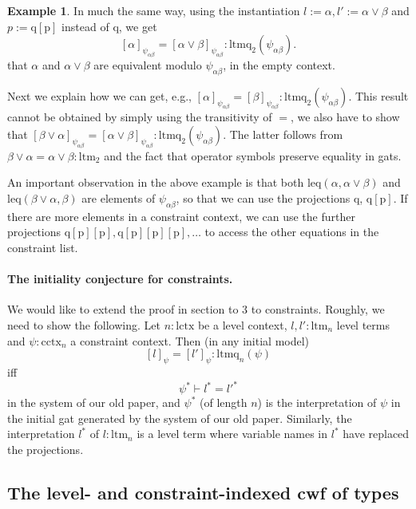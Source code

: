 \documentclass[11pt,a4paper]{article}
\theoremstyle{definition}
\newtheorem{example}{Example}
\newtheorem{conjecture}{Conjecture}
\def\psiab{\psi_{\alpha\beta}}
\def\lctx{\mathrm{lctx}}
\def\ltm{\mathrm{ltm}}
\def\ltmq{\mathrm{ltmq}}
\def\leq{\mathrm{leq}}
\def\cctx{\mathrm{cctx}}
\def\ctm{\mathrm{ctm}}
\def\p{\mathrm{p}}
\def\q{\mathrm{q}}
\begin{document}
\begin{example}
In much the same way, using the instantiation $l := \alpha,
l' := \alpha\vee\beta$ and $p := \q[\p]$ instead of $\q$, we get
\[
[\alpha]_{\psiab}=[\alpha\vee\beta]_{\psiab} : \ltmq_2(\psiab).
\]
that $\alpha$ and $\alpha\vee\beta$ are equivalent modulo $\psiab$, 
in the empty context.

Next we explain how we can get, e.g.,
$
[\alpha]_{\psiab} = [\beta]_{\psiab} : \ltmq_2(\psiab).
$
This result cannot be obtained by simply using the transitivity of $=$,
we also have to show that
$
[\beta\vee\alpha]_{\psiab}=[\alpha\vee\beta]_{\psiab} : \ltmq_2(\psiab).
$
The latter follows from 
$
\beta\vee\alpha=\alpha\vee\beta : \ltm_2$ and the fact that operator symbols preserve equality in gats.
\end{example}


An important observation in the above example is that
both $\leq(\alpha,\alpha\vee\beta)$ and $\leq(\beta\vee\alpha,\beta)$
are elements of $\psiab$, so that we can use the projections $\q$, $\q[\p]$. If there
are more elements in a constraint context, we can use the further projections $\q[\p][\p], \q[\p][\p][\p], \ldots$
to access the other equations in the constraint list.

\paragraph{The initiality conjecture for constraints.} We would like to extend the proof in section to 3 to constraints. Roughly, we need to show the following.
Let $n:\lctx$ be a level context, $l,l':\ltm_n$ level terms and 
$\psi:\cctx_n$ a constraint context. Then (in any initial model)
$$
[l]_\psi = [l']_\psi  : \ltmq_n(\psi)
$$
iff
$$
\psi^* \vdash l^* = l'^*
$$
in the system of our old paper, and $\psi^*$ (of length $n$) is the interpretation of $\psi$ in the initial gat generated by the system of our old paper. Similarly, the interpretation $l^*$ of $l : \ltm_n$ is a level term where variable names in $l^*$ have replaced the projections.

\subsection{The level- and constraint-indexed cwf of types}
\end{document}
